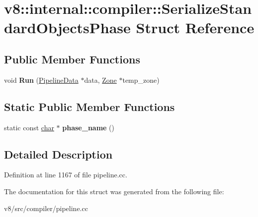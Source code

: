 \hypertarget{structv8_1_1internal_1_1compiler_1_1SerializeStandardObjectsPhase}{}\section{v8\+:\+:internal\+:\+:compiler\+:\+:Serialize\+Standard\+Objects\+Phase Struct Reference}
\label{structv8_1_1internal_1_1compiler_1_1SerializeStandardObjectsPhase}
\subsection*{Public Member Functions}
\begin{DoxyCompactItemize}
\item 
\mbox{\label{structv8_1_1internal_1_1compiler_1_1SerializeStandardObjectsPhase_adc0c354242d903756cd2dafdff41a780}} 
void {\bfseries Run} (\mbox{\hyperlink{classv8_1_1internal_1_1compiler_1_1PipelineData}{Pipeline\+Data}} $\ast$data, \mbox{\hyperlink{classv8_1_1internal_1_1Zone}{Zone}} $\ast$temp\+\_\+zone)
\end{DoxyCompactItemize}
\subsection*{Static Public Member Functions}
\begin{DoxyCompactItemize}
\item 
\mbox{\label{structv8_1_1internal_1_1compiler_1_1SerializeStandardObjectsPhase_acfc9df54b26609e62e69f639ba4b7d1b}} 
static const \mbox{\hyperlink{classchar}{char}} $\ast$ {\bfseries phase\+\_\+name} ()
\end{DoxyCompactItemize}


\subsection{Detailed Description}


Definition at line 1167 of file pipeline.\+cc.



The documentation for this struct was generated from the following file\+:\begin{DoxyCompactItemize}
\item 
v8/src/compiler/pipeline.\+cc\end{DoxyCompactItemize}
